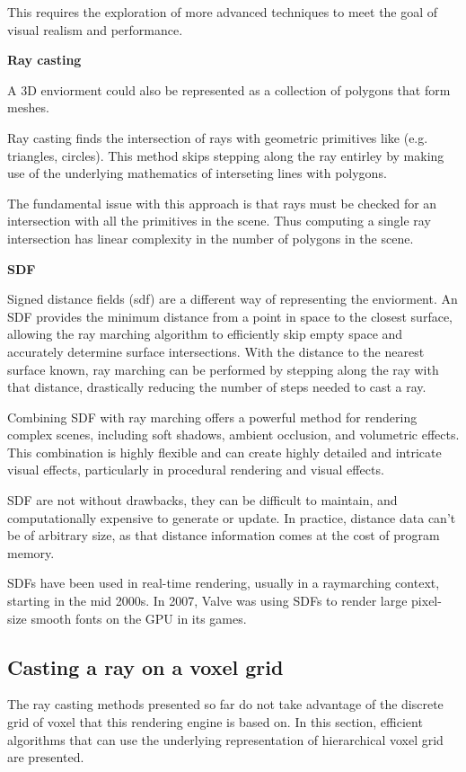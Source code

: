 This requires the exploration of more advanced techniques to meet the goal of visual realism and performance.

\vspace{0.5cm}
\textbf{Ray casting}

A 3D enviorment could also be represented as a collection of polygons that form meshes.

Ray casting finds the intersection of rays with geometric primitives like (e.g. triangles, circles). This method skips stepping along the ray entirley by making use of the underlying mathematics of interseting lines with polygons.

The fundamental issue with this approach is that rays must be checked for an intersection with all the primitives in the scene. Thus computing a single ray intersection has linear complexity in the number of polygons in the scene.

\vspace{0.5cm}
\label{def:sdf}
\textbf{SDF}

Signed distance fields (\acrshort{sdf}) are a different way of representing the enviorment. An SDF provides the minimum distance from a point in space to the closest surface, allowing the ray marching algorithm to efficiently skip empty space and accurately determine surface intersections.
With the distance to the nearest surface known, ray marching can be performed by stepping along the ray with that distance, drastically reducing the number of steps needed to cast a ray.

Combining SDF with ray marching offers a powerful method for rendering complex scenes, including soft shadows, ambient occlusion, and volumetric effects.
This combination is highly flexible and can create highly detailed and intricate visual effects, particularly in procedural rendering and visual effects.

SDF are not without drawbacks, they can be difficult to maintain, and computationally expensive to generate or update. In practice, distance data can't be of arbitrary size, as that distance information comes at the cost of program memory.

SDFs have been used in real-time rendering, usually in a raymarching context, starting in the mid 2000s. In 2007, Valve was using SDFs to render large pixel-size smooth fonts on the GPU in its games\supercite{valve}.

\subsection{Casting a ray on a voxel grid}
The ray casting methods presented so far do not take advantage of the discrete grid of voxel that this rendering engine is based on. In this section, efficient algorithms that can use the underlying representation of hierarchical voxel grid are presented.

